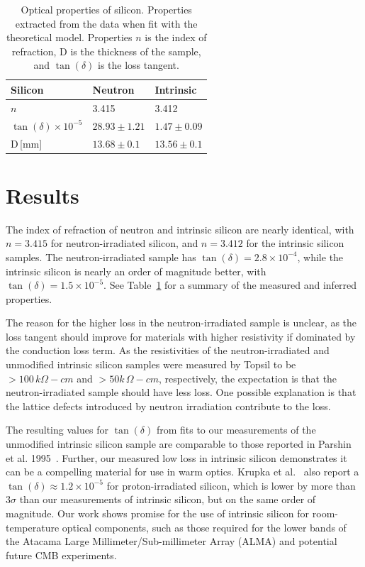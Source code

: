 \begin{table}
    \centering
\begin{tabular}{ |p{3cm}|p{3cm}|p{3cm}| }
 \hline
 Silicon & Neutron & Intrinsic\\
 \hline
  $n$ & 3.415 & 3.412 \\
 \hline
 $\tan(\delta)\times 10^{-5}$ & $28.93 \pm 1.21$ & $1.47 \pm 0.09$\\
 \hline
  D\,[mm] & $13.68 \pm 0.1 $ & $13.56 \pm 0.1$\\
 \hline
\end{tabular}
    \caption{Optical properties of silicon. Properties extracted from the data when fit with the theoretical model. Properties $n$ is the index of refraction, D is the thickness of the sample, and $\tan(\delta)$ is the loss tangent.}
    \label{tab:silicon}
\end{table}

\section{Results}

The index of refraction of neutron and intrinsic silicon are nearly identical, with $n =3.415$ for neutron-irradiated silicon, and $n =3.412$ for the intrinsic silicon samples. The neutron-irradiated sample has $\tan(\delta) = 2.8\times10^{-4}$, while the intrinsic silicon is nearly an order of magnitude better, with $\tan(\delta)= 1.5 \times 10^{-5}$. See Table~\ref{tab:silicon} for a summary of the measured and inferred properties.

The reason for the higher loss in the neutron-irradiated sample is unclear, as the loss tangent should improve for materials with higher resistivity if dominated by the conduction loss term. As the resistivities of the neutron-irradiated and unmodified intrinsic silicon samples were measured by Topsil to be $>100\,k\Omega-cm$ and $>50k\,\Omega-cm$, respectively, the expectation is that the neutron-irradiated sample should have less loss. One possible explanation is that the lattice defects introduced by neutron irradiation contribute to the loss.

The resulting values for $\tan(\delta)$ from fits to our measurements of the unmodified intrinsic silicon sample are comparable to those reported in Parshin et al. 1995~\cite{parshin}. Further, our measured low loss in intrinsic silicon demonstrates it can be a compelling material for use in warm optics. Krupka et al.~\cite{KRUPKA201676} also report a $\tan(\delta) \approx 1.2\times10^{-5}$ for proton-irradiated silicon, which is lower by more than $3\sigma$ than our measurements of intrinsic silicon, but on the same order of magnitude. Our work shows promise for the use of intrinsic silicon for room-temperature optical components, such as those required for the lower bands of the Atacama Large Millimeter/Sub-millimeter Array (ALMA) and potential future CMB experiments.


